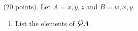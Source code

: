 \begin{prob}
(20 points). Let $A = {x, y, z}$ and $B = {w, x, y}$.
\begin{enumerate}
\item List the elements of $ \powerset A $.
\end{enumerate}
\end{prob}

















































